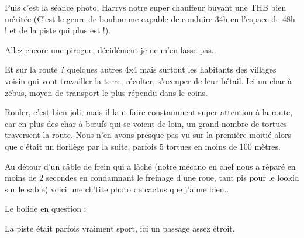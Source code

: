\begin{multicols}{2}

Puis c'est la séance photo, Harrys notre super chauffeur buvant une THB bien méritée (C'est le genre de bonhomme capable de conduire 34h en l'espace de 48h ! et de la piste qui plus est !).


Allez encore une pirogue, décidément je ne m'en lasse pas..


Et sur la route ? quelques autres 4x4 mais surtout les habitants des villages voisin qui vont travailler la terre, récolter, s'occuper de leur bétail. Ici un char à zébus, moyen de transport le plus répendu dans le coins.


Rouler, c'est bien joli, mais il faut faire constamment super attention à la route, car en plus des char à bœufs qui se voient de loin, un grand nombre de tortues traversent la route. Nous n'en avons presque pas vu sur la première moitié alors que c'était un florilège par la suite, parfois 5 tortues en moins de 100 mètres.


Au détour d'un câble de frein qui a lâché (notre mécano en chef nous a réparé en moins de 2 secondes en condamnant le freinage d'une roue, tant pis pour le lookid sur le sable) voici une ch'tite photo de cactus que j'aime bien..


Le bolide en question :


La piste était parfois vraiment sport, ici un passage assez étroit.


\end{multicols}
